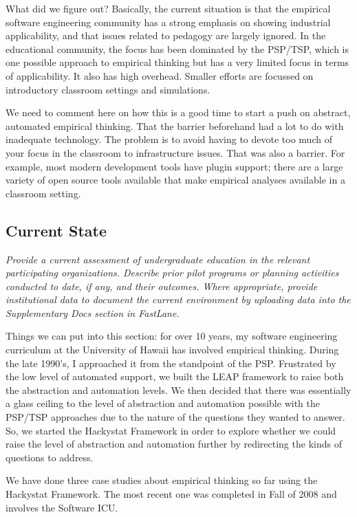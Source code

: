 What did we figure out?  Basically, the current situation is that the empirical software engineering community has a strong emphasis on showing industrial applicability, and that issues related to pedagogy are largely ignored.  In the educational community, the focus has been dominated by the PSP/TSP, which is one possible approach to empirical thinking but has a very limited focus in terms of applicability.  It also has high overhead.  Smaller efforts are focussed on introductory classroom settings and simulations.  

We need to comment here on how this is a good time to start a push on abstract, automated empirical thinking.   That the barrier beforehand had a lot to do with inadequate technology. The problem is to avoid having to devote too much of your focus in the classroom to infrastructure issues.   That was also a barrier.  For example, most modern development tools have plugin support; there are a large variety of open source tools available that make empirical analyses available in a classroom setting. 


\subsection{Current State}

{\em Provide a current assessment of undergraduate education in the relevant participating organizations.  Describe prior pilot programs or planning activities conducted to date, if any, and their outcomes.  Where appropriate, provide institutional data to document the current environment by uploading data into the Supplementary Docs section in FastLane.}

Things we can put into this section:   for over 10 years, my software engineering curriculum at the University of Hawaii has involved empirical thinking.  During the late 1990's, I approached it from the standpoint of the PSP.  Frustrated by the low level of automated support, we built the LEAP framework to raise both the abstraction and automation levels.  We then decided that there was essentially a glass ceiling to the level of abstraction and automation possible with the PSP/TSP approaches due to the nature of the questions they wanted to answer. So, we started the Hackystat Framework in order to explore whether we could raise the level of abstraction and automation further by redirecting the kinds of questions to address.

We have done three case studies about empirical thinking so far using the Hackystat Framework.  The most recent one was completed in Fall of 2008 and involves the Software ICU.  

